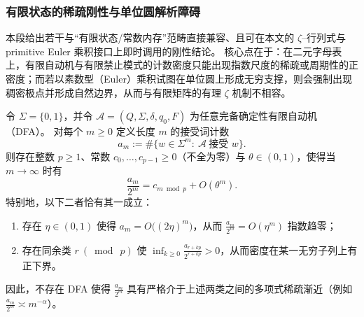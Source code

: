 \subsubsection{有限状态的稀疏刚性与单位圆解析障碍}\label{subsubsec:zeta-syntax-finite-state-sparsity-rigidity}
本段给出若干与“有限状态/常数内存”范畴直接兼容、且可在本文的 \(\zeta\)–行列式与 primitive Euler 乘积接口上即时调用的刚性结论。
核心点在于：在二元字母表上，有限自动机与有限禁止模式的计数密度只能出现指数尺度的稀疏或周期性的正密度；而若以素数型（Euler）乘积试图在单位圆上形成无穷支撑，则会强制出现稠密极点并形成自然边界，从而与有限矩阵的有理 \(\zeta\) 机制不相容。

\begin{theorem}\label{thm:zeta-syntax-dfa-density-dichotomy}
令 \(\Sigma=\{0,1\}\)，并令 \(\mathcal A=(Q,\Sigma,\delta,q_0,F)\) 为任意完备确定性有限自动机（DFA）。
对每个 \(m\ge 0\) 定义长度 \(m\) 的接受词计数
\[
a_m:=\#\{w\in\Sigma^m:\ \mathcal A\ \text{接受 }w\}.
\]
则存在整数 \(p\ge 1\)、常数 \(c_0,\dots,c_{p-1}\ge 0\)（不全为零）与 \(\theta\in(0,1)\)，使得当 \(m\to\infty\) 时有
\[
\frac{a_m}{2^m}=c_{m\bmod p}+O(\theta^m).
\]
特别地，以下二者恰有其一成立：
\begin{enumerate}
  \item 存在 \(\eta\in(0,1)\) 使得 \(a_m=O\bigl((2\eta)^m\bigr)\)，从而 \(\frac{a_m}{2^m}=O(\eta^m)\) 指数趋零；
  \item 存在同余类 \(r\ (\bmod\ p)\) 使 \(\inf_{k\ge 0}\frac{a_{r+kp}}{2^{r+kp}}>0\)，从而密度在某一无穷子列上有正下界。
\end{enumerate}
因此，不存在 DFA 使得 \(\frac{a_m}{2^m}\) 具有严格介于上述两类之间的多项式稀疏渐近（例如 \(\frac{a_m}{2^m}\asymp m^{-\alpha}\)）。
\end{theorem}
